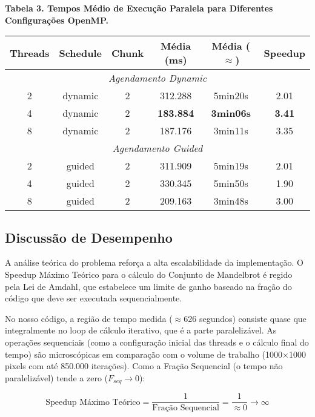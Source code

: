 \documentclass[12pt]{article}
\begin{document}
\begin{center}
    \textbf{Tabela 3. Tempos Médio de Execução Paralela para Diferentes Configurações OpenMP.} \\ 
    \begin{tabular}{cccccc}
        \toprule
        \textbf{Threads} & \textbf{Schedule} & \textbf{Chunk} & \textbf{Média (ms)} & \textbf{Média ($\approx$)} & \textbf{Speedup} \\
        \midrule
        \multicolumn{6}{c}{\textit{Agendamento Dynamic}} \\
        \midrule
        2 & dynamic & 2 & 312.288 & 5min20s & 2.01 \\
        \rowcolor[gray]{0.9} %
        4 & dynamic & 2 & \textbf{183.884} & \textbf{3min06s} & \textbf{3.41} \\
        8 & dynamic & 2 & 187.176 & 3min11s & 3.35 \\
        \midrule
        \multicolumn{6}{c}{\textit{Agendamento Guided}} \\
        \midrule
        2 & guided & 2 & 311.909 & 5min19s & 2.01 \\
        4 & guided & 2 & 330.345 & 5min50s & 1.90 \\
        8 & guided & 2 & 209.163 & 3min48s & 3.00 \\
        \bottomrule
    \end{tabular}
\end{center}

\subsection{Discussão de Desempenho}

A análise teórica do problema reforça a alta escalabilidade da implementação. O Speedup Máximo Teórico para o cálculo do Conjunto de Mandelbrot é regido pela Lei de Amdahl, que estabelece um limite de ganho baseado na fração do código que deve ser executada sequencialmente.

No nosso código, a região de tempo medida ($\approx$626 segundos) consiste quase que integralmente no loop de cálculo iterativo, que é a parte paralelizável. As operações sequenciais (como a configuração inicial das threads e o cálculo final do tempo) são microscópicas em comparação com o volume de trabalho (1000×1000 pixels com até 850.000 iterações).
Como a Fração Sequencial (o tempo não paralelizável) tende a zero ($F_{seq} \to 0$):

\[
\text{Speedup Máximo Teórico} = \frac{1}{\text{Fração Sequencial}} = \frac{1}{\approx 0} \to \infty
\]
\end{document}
